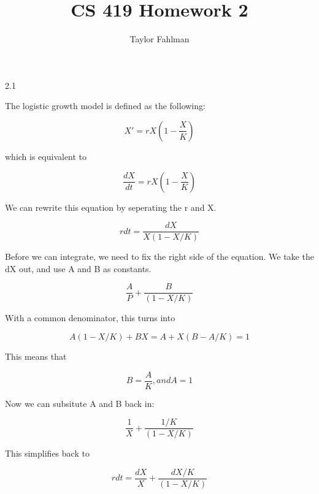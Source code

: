 \documentclass{article}
\begin{document}
\title{CS 419 Homework 2}
\author{Taylor Fahlman}
\maketitle
\begin{flushleft}
2.1\\
\end{flushleft}

The logistic growth model is defined as the following:

\begin{equation}
    X' = rX(1-\dfrac{X}{K})
\end{equation}

which is equivalent to

\begin{equation}
    \dfrac{dX}{dt} = rX(1-\dfrac{X}{K})
\end{equation}
    
We can rewrite this equation by seperating the r and X.

\begin{equation}
    r dt = \dfrac{dX}{X(1-X/K)}
\end{equation}

Before we can integrate, we need to fix the right side of the equation. We take the dX out, and use A and B as constants.

\begin{equation}
    \dfrac{A}{P} + \dfrac{B}{(1-X/K)}
\end{equation}

With a common denominator, this turns into

\begin{equation}
    A(1-X/K) + BX = A + X(B-A/K) = 1
\end{equation}

This means that

\begin{equation}
    B = \dfrac{A}{K}, and A = 1
\end{equation}

Now we can subsitute A and B back in:

\begin{equation}
    \dfrac{1}{X} + \dfrac{1/K}{(1-X/K)}
\end{equation}

This simplifies back to 

\begin{equation}
    r dt = \dfrac{dX}{X} + \dfrac{dX/K}{(1-X/K)}
\end{equation}
\end{document}
